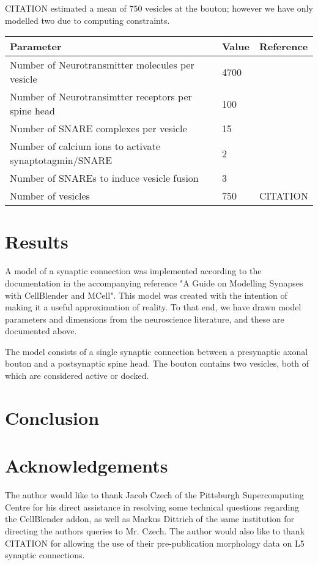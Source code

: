 \documentclass[a4paper]{article}
\begin{document}
CITATION estimated a mean of $750$ vesicles at the bouton; however we have only modelled two due to computing constraints.
\begin{table}[H]
\begin{tabular}{lll}
Parameter & Value & Reference \\ \hline
Number of Neurotransmitter molecules per vesicle & 4700&\cite{Bruns:Nature:1995} \\
Number of Neurotransimtter receptors per spine head & 100 & \cite{Stricker:JPhysiol:1996} \\
Number of SNARE complexes per vesicle & 15 & \cite{Wilhelm:Science:2014} \\ 
Number of calcium ions to activate synaptotagmin/SNARE & 2 & \cite{Dittrich:BiophysJ:2013} \\
Number of SNAREs to induce vesicle fusion & 3 & \cite{Dittrich:BiophysJ:2013} \\  
Number of vesicles & 750 & CITATION\\
\end{tabular}
\end{table}

\section{Results}
A model of a synaptic connection was implemented according to the documentation in the accompanying reference "A Guide on Modelling Synapses with CellBlender and MCell". This model was created with the intention of making it a useful approximation of reality. To that end, we have drawn model parameters and dimensions from the neuroscience literature, and these are documented above.

The model consists of a single synaptic connection between a presynaptic axonal bouton and a postsynaptic spine head. The bouton contains two vesicles, both of which are considered active or docked. 
\section{Conclusion}

\section{Acknowledgements}
The author would like to thank Jacob Czech of the Pittsburgh Supercomputing Centre for his direct assistance in resolving some technical questions regarding the CellBlender addon, as well as Markus Dittrich of the same institution for directing the authors queries to Mr. Czech. The author would also like to thank CITATION for allowing the use of their pre-publication morphology data on L5 synaptic connections.


{}

\end{document}
